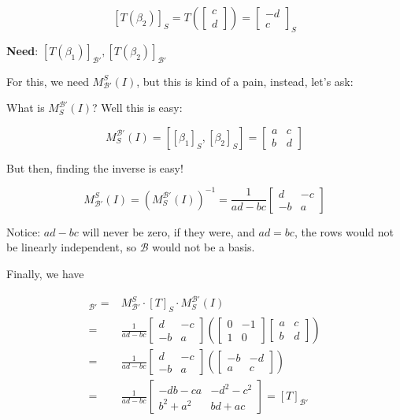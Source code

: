 \documentclass[12pt]{article}
\def\B{\mathcal B}
\begin{document}
  \[
    [T(\beta_2)]_S = T(\begin{bmatrix}
      c \\ d
    \end{bmatrix})
    =
    \begin{bmatrix}
      -d \\ c
    \end{bmatrix}_S
  \]

  {\bf Need}: $[T(\beta_1)]_{\B'}, [T(\beta_2)]_{\B'}$

  For this, we need $M_{\B'}^S (I)$, but this is kind of a pain, instead, let's
  ask:

  What is $M_{S}^{\B'} (I)$? Well this is easy:

  \[
    M_{S}^{\B'} (I) = \left[
      [\beta_1]_S, [\beta_2]_S
    \right]
    =
    \begin{bmatrix}
      a & c \\
      b & d
    \end{bmatrix}
  \]

  But then, finding the inverse is easy!

  \[
    M_{\B'}^{S} (I) = \left(M_{S}^{\B'} (I)\right)^{-1}
    =
    \frac{1}{ad - bc}
    \begin{bmatrix}
      d & -c \\
      -b & a
    \end{bmatrix}
  \]

  Notice: $ad - bc$ will never be zero, if they were, and $ad = bc$, the rows
  would not be linearly independent, so $\B$ would not be a basis.

  Finally, we have

  \begin{align*}
    [T]_{\B'} =&M_{\B'}^S \cdot [T]_S \cdot M_S^{\B'} (I) \\
    =&
    \frac{1}{ad - bc}
    \begin{bmatrix}
      d & -c \\
      -b & a
    \end{bmatrix}
    \left(
    \begin{bmatrix}
      0 & -1 \\ 1 & 0
    \end{bmatrix}
    \begin{bmatrix}
      a & c \\ b & d
    \end{bmatrix}
    \right) \\
    =&
    \frac{1}{ad - bc}
    \begin{bmatrix}
      d & -c \\
      -b & a
    \end{bmatrix}
    \left(
    \begin{bmatrix}
      -b & -d \\ a & c
    \end{bmatrix}
    \right) \\
    =&
    \frac{1}{ad - bc}
    \begin{bmatrix}
      -db - ca & -d^2 - c^2 \\
      b^2 + a^2 & bd + ac
    \end{bmatrix}
    = [T]_{\B'}
  \end{align*}
\end{document}
